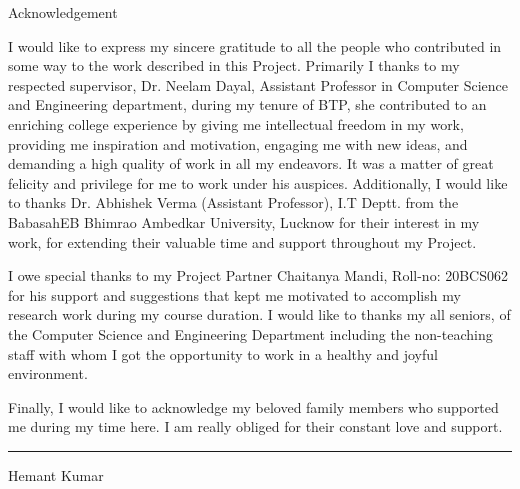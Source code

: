 \documentclass[12pt,twocolumn]{article}
\begin{document}
\begin{titlepage}
    \begin{center}
        \vspace*{1cm}
        
        { \LARGE Acknowledgement}
        
        \vspace{1.2cm}
        
       \large I would like to express my sincere gratitude to all the people who contributed in some way to the work described in this Project. Primarily I thanks to my respected supervisor, {Dr. Neelam Dayal}, Assistant Professor in Computer Science and Engineering department, during my tenure of {BTP}, she contributed to an enriching college experience by giving me intellectual freedom in my work, providing me inspiration and motivation, engaging me with new ideas, and demanding a high quality of work in all my endeavors. It was a matter of great felicity and privilege for me to work under his auspices. Additionally, I would like to thanks {Dr. Abhishek Verma} (Assistant Professor), I.T Deptt. from the {BabasahEB Bhimrao Ambedkar University, Lucknow} for their interest in my work, for extending their valuable time and support throughout my Project.

       I owe special thanks to my Project Partner {Chaitanya Mandi, Roll-no: 20BCS062} for his support and suggestions that kept me motivated to accomplish my research work during my course duration.  I would like to thanks my all seniors, of the Computer Science and Engineering Department including the non-teaching staff with whom I got the opportunity to work in a healthy and joyful environment.

       Finally, I would like to acknowledge my beloved family members who supported me during my time here. I am really obliged for their constant love and support.
        
        \vfill %
        
        \hrule %
        
        \vspace{1cm} %
        
    \hfill {Hemant Kumar}
        
        
        
    \end{center}
\end{titlepage}
\end{document}
